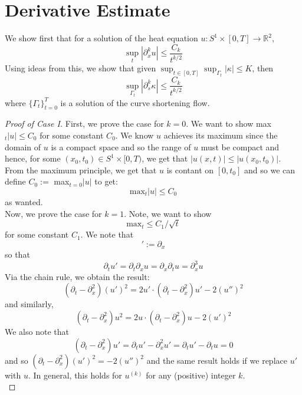 \documentclass{article}
\begin{document}
\section{Derivative Estimate}

We show first that for a solution of the heat equation $u: S^1 \times [0,T] \to \mathbb{R}^2$,
\[ \sup_{t} |\partial_x^k u| \leq \frac{C_k}{t^{k/2}} \]
Using ideas from this, we show that given $\sup_{t\in [0,T]} \sup_{\Gamma_t} |\kappa| \leq K$, then
\[ \sup_{\Gamma_t} |\partial_s^k \kappa| \leq \frac{C_k}{t^{k/2}} \]
where $\{\Gamma_t\}_{t=0}^T$ is a solution of the curve shortening flow.

\begin{proof}[Proof of Case I]
    First, we prove the case for $k=0$. We want to show max$_t |u| \leq C_0$ for some constant $C_0$. We know $u$ achieves its maximum since
    the domain of $u$ is a compact space and so the range of $u$ must be compact and hence, for some $(x_0,t_0)\in S^1\times [0,T)$, we get that
    $|u(x,t)| \leq |u(x_0,t_0)|$. From the maximum principle, we get that $u$ is contant on $[0,t_0]$ and so we can define $C_0 :=$ max$_{t=0} |u|$ to get:
    \[ \text{max}_t |u| \leq C_0 \]
    as wanted. \\

    Now, we prove the case for $k=1$. Note, we want to show
    \[ \text{max}_t \leq C_1/\sqrt{t} \]
    for some constant $C_1$. We note that
    \[ ' := \partial_x \]
    so that
    \[ \partial_t u' = \partial_t \partial_x u = \partial_x \partial_t u = \partial_x^3 u \]
    Via the chain rule, we obtain the result:
    \[ (\partial_t - \partial_x^2) (u')^2 = 2u' \cdot (\partial_t - \partial_x^2) u' - 2(u'')^2 \]
    and similarly,
    \[ (\partial_t - \partial_x^2) u^2 = 2u \cdot (\partial_t - \partial_x^2) u - 2(u')^2 \]
    We also note that
    \[ (\partial_t - \partial_x^2) u' = \partial_t u' - \partial_x^2 u' = \partial_t u' - \partial_t u = 0 \]
    and so $(\partial_t - \partial_x^2) (u')^2 = -2(u'')^2$ and the same result holds if we
    replace $u'$ with $u$. In general, this holds for $u^{(k)}$ for any (positive) integer $k$.\\


\end{proof}
\end{document}
